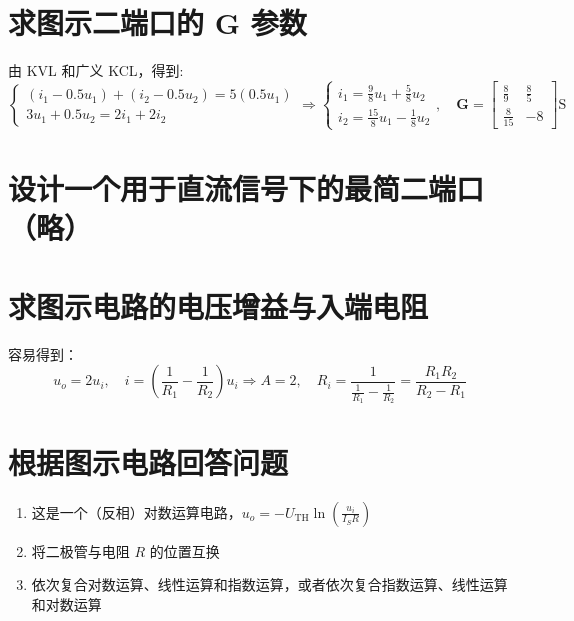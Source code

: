 \documentclass[UTF8]{report}
\theoremstyle{MyLineTheoremStyle} %
\theoremstyle{MyBlockTheoremStyle} %
\theoremstyle{MySubsubsectionStyle} %
\begin{document}
\section{求图示二端口的 $\boldsymbol{G}$ 参数}\thispagestyle{fancy}

由 KVL 和广义 KCL，得到: 
\begin{equation}
\begin{cases}
    (i_1 - 0.5u_1) + (i_2 - 0.5u_2) = 5(0.5u_1) \\ 
    3u_1 + 0.5u_2 = 2i_1 + 2i_2
\end{cases}
\Longrightarrow 
\begin{cases}
    i_1 = \frac{9}{8}u_1 + \frac{5}{8}u_2 \\ 
    i_2 = \frac{15}{8}u_1 - \frac{1}{8}u_2
\end{cases}
,\quad \boldsymbol{G} = 
\begin{bmatrix}
    \frac{8}{9} & \frac{8}{5} \\ 
    \frac{8}{15} & - 8
\end{bmatrix}
\mathrm{S}
\end{equation}

\section{设计一个用于直流信号下的最简二端口（略）}

\section{求图示电路的电压增益与入端电阻}

容易得到：
\begin{equation}
u_o = 2u_i,\quad i = (\frac{1}{R_1} - \frac{1}{R_2})u_i \Longrightarrow A = 2,\quad R_{i} = \frac{1}{\frac{1}{R_1} - \frac{1}{R_2}} = \frac{R_1R_2}{R_2-R_1}
\end{equation}

\section{根据图示电路回答问题}

\begin{enumerate}[label=(\arabic*)]
\item 这是一个（反相）对数运算电路，$u_o = - U_{\text{TH}} \ln \left( \frac{u_i}{I_S R} \right)$
\item 将二极管与电阻 $R$ 的位置互换
\item 依次复合对数运算、线性运算和指数运算，或者依次复合指数运算、线性运算和对数运算
\end{enumerate}
\end{document}
